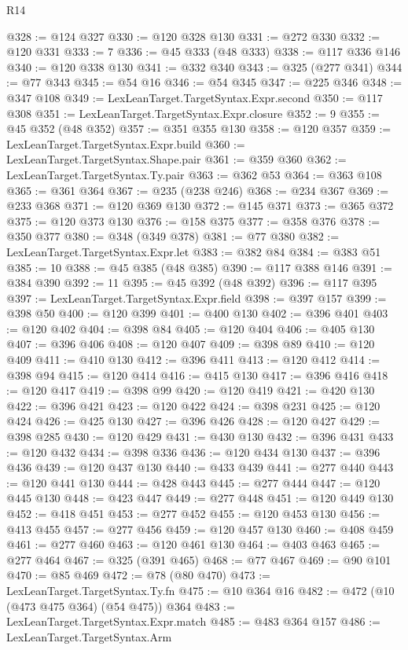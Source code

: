 \begin{lexlean}{R14}
\begin{coremodule}
@328 := @124 @327
@330 := @120 @328 @130
@331 := @272 @330
@332 := @120 @331
@333 := 7
@336 := @45 @333 (@48 @333)
@338 := @117 @336 @146
@340 := @120 @338 @130
@341 := @332 @340
@343 := @325 (@277 @341)
@344 := @77 @343
@345 := @54 @16
@346 := @54 @345
@347 := @225 @346
@348 := @347 @108
@349 := LexLeanTarget.TargetSyntax.Expr.second
@350 := @117 @308
@351 := LexLeanTarget.TargetSyntax.Expr.closure
@352 := 9
@355 := @45 @352 (@48 @352)
@357 := @351 @355 @130
@358 := @120 @357
@359 := LexLeanTarget.TargetSyntax.Expr.build
@360 := LexLeanTarget.TargetSyntax.Shape.pair
@361 := @359 @360
@362 := LexLeanTarget.TargetSyntax.Ty.pair
@363 := @362 @53
@364 := @363 @108
@365 := @361 @364
@367 := @235 (@238 @246)
@368 := @234 @367
@369 := @233 @368
@371 := @120 @369 @130
@372 := @145 @371
@373 := @365 @372
@375 := @120 @373 @130
@376 := @158 @375
@377 := @358 @376
@378 := @350 @377
@380 := @348 (@349 @378)
@381 := @77 @380
@382 := LexLeanTarget.TargetSyntax.Expr.let
@383 := @382 @84
@384 := @383 @51
@385 := 10
@388 := @45 @385 (@48 @385)
@390 := @117 @388 @146
@391 := @384 @390
@392 := 11
@395 := @45 @392 (@48 @392)
@396 := @117 @395
@397 := LexLeanTarget.TargetSyntax.Expr.field
@398 := @397 @157
@399 := @398 @50
@400 := @120 @399
@401 := @400 @130
@402 := @396 @401
@403 := @120 @402
@404 := @398 @84
@405 := @120 @404
@406 := @405 @130
@407 := @396 @406
@408 := @120 @407
@409 := @398 @89
@410 := @120 @409
@411 := @410 @130
@412 := @396 @411
@413 := @120 @412
@414 := @398 @94
@415 := @120 @414
@416 := @415 @130
@417 := @396 @416
@418 := @120 @417
@419 := @398 @99
@420 := @120 @419
@421 := @420 @130
@422 := @396 @421
@423 := @120 @422
@424 := @398 @231
@425 := @120 @424
@426 := @425 @130
@427 := @396 @426
@428 := @120 @427
@429 := @398 @285
@430 := @120 @429
@431 := @430 @130
@432 := @396 @431
@433 := @120 @432
@434 := @398 @336
@436 := @120 @434 @130
@437 := @396 @436
@439 := @120 @437 @130
@440 := @433 @439
@441 := @277 @440
@443 := @120 @441 @130
@444 := @428 @443
@445 := @277 @444
@447 := @120 @445 @130
@448 := @423 @447
@449 := @277 @448
@451 := @120 @449 @130
@452 := @418 @451
@453 := @277 @452
@455 := @120 @453 @130
@456 := @413 @455
@457 := @277 @456
@459 := @120 @457 @130
@460 := @408 @459
@461 := @277 @460
@463 := @120 @461 @130
@464 := @403 @463
@465 := @277 @464
@467 := @325 (@391 @465)
@468 := @77 @467
@469 := @90 @101
@470 := @85 @469
@472 := @78 (@80 @470)
@473 := LexLeanTarget.TargetSyntax.Ty.fn
@475 := @10 @364 @16
@482 := @472 (@10 (@473 @475 @364) (@54 @475)) @364
@483 := LexLeanTarget.TargetSyntax.Expr.match
@485 := @483 @364 @157
@486 := LexLeanTarget.TargetSyntax.Arm

\end{coremodule}
\end{lexlean}
